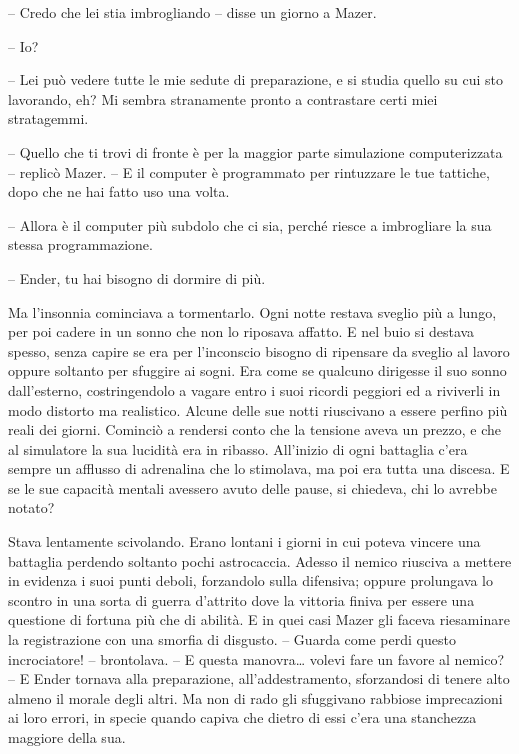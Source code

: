 {-- Credo che lei stia imbrogliando -- disse un giorno a Mazer.}

{-- Io?}

{-- Lei può vedere tutte le mie sedute di preparazione, e si studia
	quello su cui sto lavorando, eh? Mi sembra stranamente pronto a
	contrastare certi miei stratagemmi.}

{-- Quello che ti trovi di fronte è per la maggior parte simulazione
	computerizzata -- replicò Mazer. -- E il computer è programmato per
	rintuzzare le tue tattiche, dopo che ne hai fatto uso una volta.}

{-- Allora è il computer più subdolo che ci sia, perché riesce a
	imbrogliare la sua stessa programmazione.}

{-- Ender, tu hai bisogno di dormire di più.}

{Ma l'insonnia cominciava a tormentarlo. Ogni notte restava sveglio più
	a lungo, per poi cadere in un sonno che non lo riposava affatto. E nel
	buio si destava spesso, senza capire se era per l'inconscio bisogno di
	ripensare da sveglio al lavoro oppure soltanto per sfuggire ai sogni.
	Era come se qualcuno dirigesse il suo sonno dall'esterno, costringendolo
	a vagare entro i suoi ricordi peggiori ed a riviverli in modo distorto
	ma realistico. Alcune delle sue notti riuscivano a essere perfino più
	reali dei giorni. Cominciò a rendersi conto che la tensione aveva un
	prezzo, e che al simulatore la sua lucidità era in ribasso. All'inizio
	di ogni battaglia c'era sempre un afflusso di adrenalina che lo
	stimolava, ma poi era tutta una discesa. E se le sue capacità mentali
	avessero avuto delle pause, si chiedeva, chi lo avrebbe notato?}

{Stava lentamente scivolando. Erano lontani i giorni in cui poteva
	vincere una battaglia perdendo soltanto pochi astrocaccia. Adesso il
	nemico riusciva a mettere in evidenza i suoi punti deboli, forzandolo
	sulla difensiva; oppure prolungava lo scontro in una sorta di guerra
	d'attrito dove la vittoria finiva per essere una questione di fortuna
	più che di abilità. E in quei casi Mazer gli faceva riesaminare la
	registrazione con una smorfia di disgusto. -- Guarda come perdi questo
	incrociatore! -- brontolava. -- E questa manovra\ldots{} volevi fare un
	favore al nemico? -- E Ender tornava alla preparazione,
	all'addestramento, sforzandosi di tenere alto almeno il morale degli
	altri. Ma non di rado gli sfuggivano rabbiose imprecazioni ai loro
	errori, in specie quando capiva che dietro di essi c'era una stanchezza
	maggiore della sua.}

